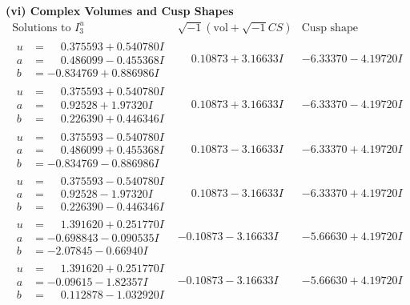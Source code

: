 \documentclass[1p]{elsarticle_modified}
\theoremstyle{definition}
\newcommand{\I}{\sqrt{-1}}
\begin{document}
\newpage\flushleft \textbf{(vi) Complex Volumes and Cusp Shapes}
$$\begin{array}{c|c|c}  
\text{Solutions to }I^u_{3}& \I (\text{vol} + \sqrt{-1}CS) & \text{Cusp shape}\\
 \hline 
\begin{aligned}
u &= \phantom{-}0.375593 + 0.540780 I \\
a &= \phantom{-}0.486099 - 0.455368 I \\
b &= -0.834769 + 0.886986 I\end{aligned}
 & \phantom{-}0.10873 + 3.16633 I & -6.33370 - 4.19720 I \\ \hline\begin{aligned}
u &= \phantom{-}0.375593 + 0.540780 I \\
a &= \phantom{-}0.92528 + 1.97320 I \\
b &= \phantom{-}0.226390 + 0.446346 I\end{aligned}
 & \phantom{-}0.10873 + 3.16633 I & -6.33370 - 4.19720 I \\ \hline\begin{aligned}
u &= \phantom{-}0.375593 - 0.540780 I \\
a &= \phantom{-}0.486099 + 0.455368 I \\
b &= -0.834769 - 0.886986 I\end{aligned}
 & \phantom{-}0.10873 - 3.16633 I & -6.33370 + 4.19720 I \\ \hline\begin{aligned}
u &= \phantom{-}0.375593 - 0.540780 I \\
a &= \phantom{-}0.92528 - 1.97320 I \\
b &= \phantom{-}0.226390 - 0.446346 I\end{aligned}
 & \phantom{-}0.10873 - 3.16633 I & -6.33370 + 4.19720 I \\ \hline\begin{aligned}
u &= \phantom{-}1.391620 + 0.251770 I \\
a &= -0.698843 - 0.090535 I \\
b &= -2.07845 - 0.66940 I\end{aligned}
 & -0.10873 - 3.16633 I & -5.66630 + 4.19720 I \\ \hline\begin{aligned}
u &= \phantom{-}1.391620 + 0.251770 I \\
a &= -0.09615 - 1.82357 I \\
b &= \phantom{-}0.112878 - 1.032920 I\end{aligned}
 & -0.10873 - 3.16633 I & -5.66630 + 4.19720 I \\ \hline\begin{aligned}

\end{aligned}
\end{array}$$
\end{document}
